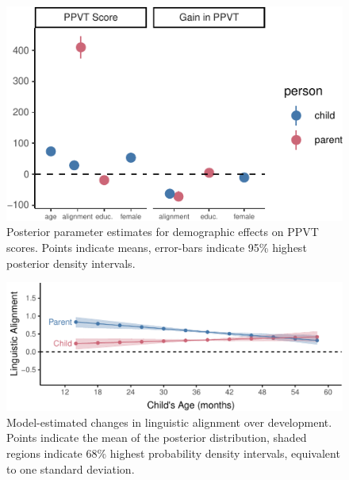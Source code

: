 \documentclass[10pt, letterpaper]{article}
\newenvironment{CodeChunk}{}{}
\begin{document}
\begin{CodeChunk}
\begin{figure}[tb]
\includegraphics{figs/demopar_plot-1} \caption[Posterior parameter estimates for demographic effects on PPVT scores]{Posterior parameter estimates for demographic effects on PPVT scores. Points indicate means, error-bars indicate 95\% highest posterior density intervals.}\label{fig:demopar_plot}
\end{figure}
\end{CodeChunk}

\begin{CodeChunk}
\begin{figure}[tb]

{\centering \includegraphics{figs/hpds-1} 

}

\caption[Model-estimated changes in linguistic alignment over development]{Model-estimated changes in linguistic alignment over development. Points indicate the mean of the posterior distribution, shaded regions indicate 68\% highest probability density intervals, equivalent to one standard deviation.}\label{fig:hpds}
\end{figure}
\end{CodeChunk}
\end{document}

